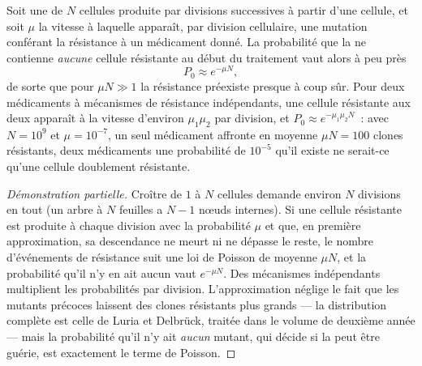 \begin{theorem}\label{thm:b3:cancer-biology:goldie-coldman}
Soit une  de $N$ cellules produite par divisions successives à
partir d'une cellule, et soit $\mu$ la vitesse à laquelle apparaît, par
division cellulaire, une mutation conférant la résistance à un
médicament donné. La probabilité que la  ne contienne
\emph{aucune} cellule résistante au début du traitement vaut alors à peu
près
\[
P_{0} \approx e^{-\mu N},
\]
de sorte que pour $\mu N \gg 1$ la résistance préexiste presque à coup
sûr. Pour deux médicaments à mécanismes de résistance indépendants, une
cellule résistante aux deux apparaît à la vitesse d'environ
$\mu_{1}\mu_{2}$ par division, et $P_{0}
\approx e^{-\mu_{1}\mu_{2}N}$~: avec $N = 10^{9}$ et $\mu = 10^{-7}$, un
seul médicament affronte en moyenne $\mu N = 100$ clones résistants,
deux médicaments une probabilité de $10^{-5}$ qu'il existe ne
serait-ce qu'une cellule doublement résistante.
\end{theorem}
\begin{proof}[Démonstration partielle]
Croître de $1$ à $N$ cellules demande environ $N$ divisions en tout (un
arbre à $N$ feuilles a $N - 1$ nœuds internes). Si une cellule
résistante est produite à chaque division avec la probabilité $\mu$ et
que, en première approximation, sa descendance ne meurt ni ne dépasse
le reste, le nombre d'événements de résistance suit une loi de Poisson
de moyenne $\mu N$, et la probabilité qu'il n'y en ait aucun vaut
$e^{-\mu N}$. Des mécanismes indépendants multiplient les probabilités
par division. L'approximation néglige le fait que les mutants précoces
laissent des clones résistants plus grands --- la distribution complète
est celle de Luria et Delbrück, traitée dans le volume de deuxième
année --- mais la probabilité qu'il n'y ait \emph{aucun} mutant, qui
décide si la  peut être guérie, est exactement le terme de
Poisson.
\end{proof}

